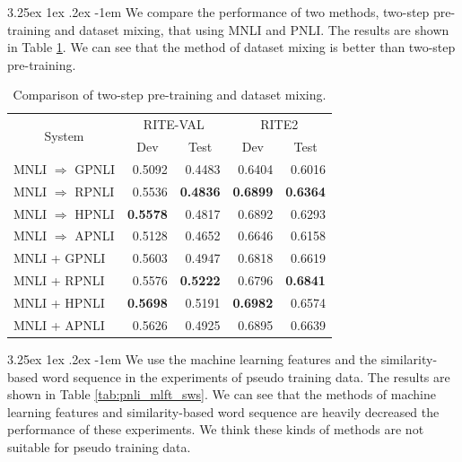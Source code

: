 \documentclass[12pt]{article}
\makeatletter
\renewcommand\paragraph{\@startsection{paragraph}{5}{\z@}%
  {3.25ex \@plus1ex \@minus.2ex}%
  {-1em}%
  {\normalfont\normalsize\bfseries}}
\makeatother
\begin{document}
\begin{CJK*}{UTF8}{bkai}
\begin{spacing}{1.77}
\paragraph{}
We compare the performance of two methods, two-step pre-training and dataset mixing, that using MNLI and PNLI. The results are shown in Table \ref{tab:cmp_mixed_2step}. We can see that the method of dataset mixing is better than two-step pre-training.

\begin{table}[H]
  \centering
  \setlength{\extrarowheight}{-3pt}
  \caption{Comparison of two-step pre-training and dataset mixing.}
  \label{tab:cmp_mixed_2step}
  \begin{tabular}{|l|r|r|r|r|}
  \hline
  \multicolumn{1}{|c|}{\multirow{2}{*}{System}} & \multicolumn{2}{c|}{RITE-VAL} & \multicolumn{2}{c|}{RITE2} \\ \cline{2-5}
  \multicolumn{1}{|c|}{} & \multicolumn{1}{c|}{Dev} & \multicolumn{1}{c|}{Test} & \multicolumn{1}{c|}{Dev} & \multicolumn{1}{c|}{Test} \\ \hline
  MNLI $\Rightarrow$ GPNLI & 0.5092 & 0.4483 & 0.6404 & 0.6016 \\ \hline
  MNLI $\Rightarrow$ RPNLI & 0.5536 & \textbf{0.4836} & \textbf{0.6899} & \textbf{0.6364} \\ \hline
  MNLI $\Rightarrow$ HPNLI & \textbf{0.5578} & 0.4817 & 0.6892 & 0.6293 \\ \hline
  MNLI $\Rightarrow$ APNLI & 0.5128 & 0.4652 & 0.6646 & 0.6158 \\
  \hline \hline
  MNLI + GPNLI & 0.5603 & 0.4947 & 0.6818 & 0.6619 \\ \hline
  MNLI + RPNLI & 0.5576 & \textbf{0.5222} & 0.6796 & \textbf{0.6841} \\ \hline
  MNLI + HPNLI & \textbf{0.5698} & 0.5191 & \textbf{0.6982} & 0.6574 \\ \hline
  MNLI + APNLI & 0.5626 & 0.4925 & 0.6895 & 0.6639 \\ \hline
  \end{tabular}
\end{table}

\paragraph{}
We use the machine learning features and the similarity-based word sequence in the experiments of pseudo training data. The results are shown in Table \ref{tab:pnli_mlft_sws}. We can see that the methods of machine learning features and similarity-based word sequence are heavily decreased the performance of these experiments. We think these kinds of methods are not suitable for pseudo training data.


\end{spacing}
\end{CJK*}
\end{document}
